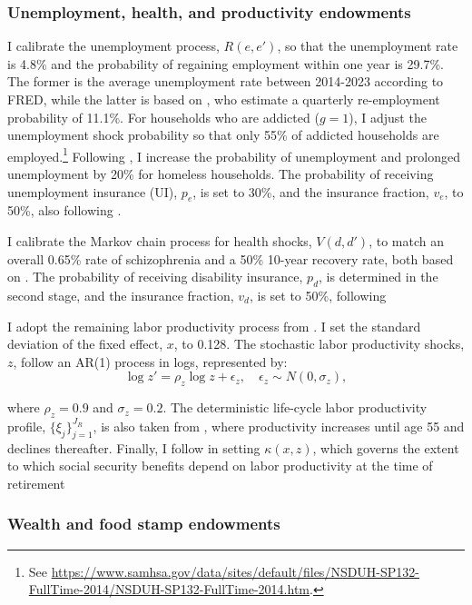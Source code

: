 \documentclass[parskip=full]{article}
\begin{document}
\subsubsection{Unemployment, health, and productivity endowments}

I calibrate the unemployment process, $R(e,e')$, so that the unemployment rate is 4.8\% and the probability of regaining employment within one year is 29.7\%. The former is the average unemployment rate between 2014-2023 according to FRED, while the latter is based on \citet{kruegeretal-2016}, who estimate a quarterly re-employment probability of 11.1\%. For households who are addicted ($g=1$), I adjust the unemployment shock probability so that only 55\% of addicted households are employed.\footnote{See \url{https://www.samhsa.gov/data/sites/default/files/NSDUH-SP132-FullTime-2014/NSDUH-SP132-FullTime-2014.htm}.} Following \citet{az-2024}, I increase the probability of unemployment and prolonged unemployment by 20\% for homeless households. The probability of receiving unemployment insurance (UI), $p_e$, is set to 30\%, and the insurance fraction, $v_e$, to 50\%, also following \citet{az-2024}.

I calibrate the Markov chain process for health shocks, $V(d,d')$, to match an overall 0.65\% rate of schizophrenia and a 50\% 10-year recovery rate, both based on \citet{az-2024}. The probability of receiving disability insurance, $p_d$, is determined in the second stage, and the insurance fraction, $v_d$, is set to 50\%, following \citet{az-2024}

I adopt the remaining labor productivity process from \citet{gkkoc}. I set the standard deviation of the fixed effect, $x$, to 0.128. The stochastic labor productivity shocks, $z$, follow an AR(1) process in logs, represented by:
\begin{equation*} 
\log z' = \rho_z \log z + \epsilon_{z},\quad \epsilon_{z}\sim N(0,\sigma_{z}), 
\end{equation*}

\noindent where $\rho_z = 0.9$ and $\sigma_z = 0.2$. The deterministic life-cycle labor productivity profile, $\{\xi_{j}\}_{j=1}^{J_{R}}$, is also taken from \citet{gkkoc}, where productivity increases until age 55 and declines thereafter. Finally, I follow \citet{gkkoc} in setting $\kappa(x,z)$, which governs the extent to which social security benefits depend on labor productivity at the time of retirement

\subsubsection{Wealth and food stamp endowments}
\end{document}
